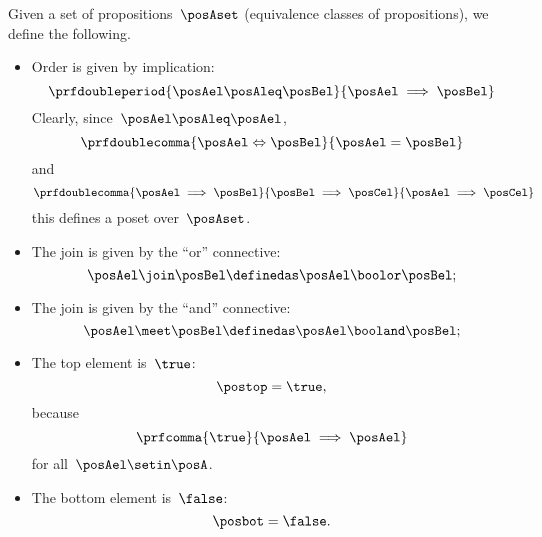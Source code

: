 \begin{ctdefinition}
    \label{def:prop-as-lattice}
    Given a set of propositions~$\posAset$ (equivalence classes of propositions), we define the following.
    \begin{itemize}
        \item Order is given by implication:
              \begin{equation*}
                  \prfdoubleperiod{\posAel\posAleq \posBel}{\posAel \implies \posBel}
              \end{equation*}
              Clearly, since~$\posAel \posAleq \posAel$,
              \begin{equation*}
                  \prfdoublecomma{\posAel \Leftrightarrow \posBel}{\posAel =\posBel}
              \end{equation*}
              and
              \begin{equation*}
                  \prfdoublecomma{\posAel \implies \posBel}{\posBel \implies \posCel}{\posAel \implies \posCel}
              \end{equation*}
              this defines a poset over~$\posAset$.
        \item The join is given by the ``or'' connective:
              \begin{equation*}
                  \posAel \join \posBel \definedas \posAel \boolor \posBel;
              \end{equation*}
        \item The join is given by the ``and'' connective:
              \begin{equation*}
                  \posAel \meet \posBel \definedas \posAel \booland \posBel;
              \end{equation*}
        \item The top element is~$\true$:
              \begin{equation*}
                  \postop = \true,
              \end{equation*}
              because
              \begin{equation*}
                  \prfcomma{\true}{\posAel \implies \posAel}
              \end{equation*}
              for all~$\posAel\setin \posA$.
        \item The bottom element is~$\false$:
              \begin{equation*}
                  \posbot = \false.
              \end{equation*}
    \end{itemize}
\end{ctdefinition}
\begin{marginfigure}
    \centering
    \caption{}
    \label{fig:prod_coprod_prop}
\end{marginfigure}

